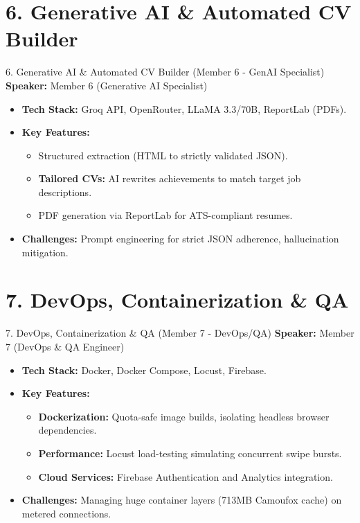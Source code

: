 \documentclass[aspectratio=169]{beamer}
\begin{document}
\section{6. Generative AI \& Automated CV Builder}
\begin{frame}{6. Generative AI \& Automated CV Builder (Member 6 - GenAI Specialist)}
    \textbf{Speaker:} Member 6 (Generative AI Specialist)
    \vspace{0.5cm}
    \begin{itemize}
        \item \textbf{Tech Stack:} Groq API, OpenRouter, LLaMA 3.3/70B, ReportLab (PDFs).
        \item \textbf{Key Features:}
        \begin{itemize}
            \item Structured extraction (HTML to strictly validated JSON).
            \item \textbf{Tailored CVs:} AI rewrites achievements to match target job descriptions.
            \item PDF generation via ReportLab for ATS-compliant resumes.
        \end{itemize}
        \item \textbf{Challenges:} Prompt engineering for strict JSON adherence, hallucination mitigation.
    \end{itemize}
\end{frame}

\section{7. DevOps, Containerization \& QA}
\begin{frame}{7. DevOps, Containerization \& QA (Member 7 - DevOps/QA)}
    \textbf{Speaker:} Member 7 (DevOps \& QA Engineer)
    \vspace{0.5cm}
    \begin{itemize}
        \item \textbf{Tech Stack:} Docker, Docker Compose, Locust, Firebase.
        \item \textbf{Key Features:}
        \begin{itemize}
            \item \textbf{Dockerization:} Quota-safe image builds, isolating headless browser dependencies.
            \item \textbf{Performance:} Locust load-testing simulating concurrent swipe bursts.
            \item \textbf{Cloud Services:} Firebase Authentication and Analytics integration.
        \end{itemize}
        \item \textbf{Challenges:} Managing huge container layers (713MB Camoufox cache) on metered connections.
    \end{itemize}
\end{frame}
\end{document}
